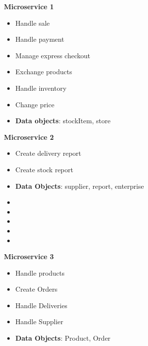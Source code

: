 \begin{multicols}{3}
	\textbf{Microservice 1}
	\begin{flushleft}
	\begin{itemize}[noitemsep]
	\item Handle sale
	\item Handle payment
	\item Manage express checkout
	\item Exchange products
	\item Handle inventory
	\item Change price
	\item \textbf{Data objects}: stockItem, store
	\end{itemize}
	\end{flushleft}


	\vfill
	\columnbreak
	\textbf{Microservice 2}
	\begin{flushleft}
	\begin{itemize}[noitemsep]
	\item Create delivery report
	\item Create stock report
	\item \textbf{Data Objects}: supplier, report, enterprise
    \item[]
    \item[]
    \item[]
    \item[]
    \item[]
	\end{itemize}
	\end{flushleft}
	
	
	\vfill
	\columnbreak
	\textbf{Microservice 3}
	\begin{flushleft}
	\begin{itemize}[noitemsep]
		\item Handle products
		\item Create Orders
		\item Handle Deliveries
		\item Handle Supplier
		\item \textbf{Data Objects}: Product, Order
	\end{itemize}
\end{flushleft}
\end{multicols}











